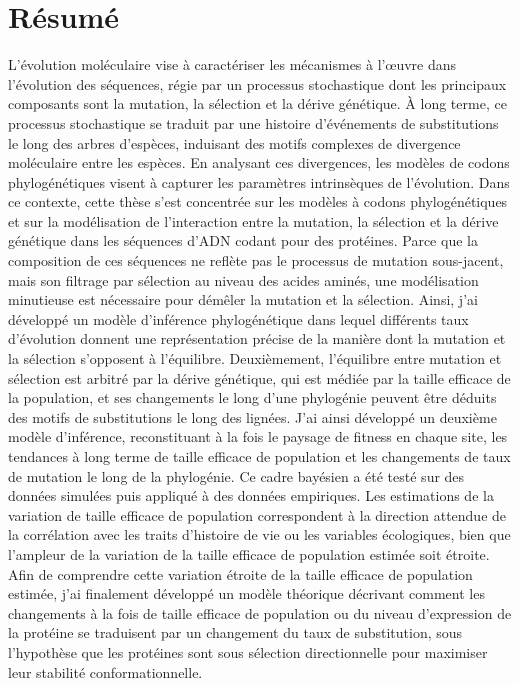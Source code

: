 \thispagestyle{empty}

\section*{Résumé}

L'évolution moléculaire vise à caractériser les mécanismes à l'œuvre dans l'évolution des séquences, régie par un processus stochastique dont les principaux composants sont la mutation, la sélection et la dérive génétique.
À long terme, ce processus stochastique se traduit par une histoire d'événements de substitutions le long des arbres d'espèces, induisant des motifs complexes de divergence moléculaire entre les espèces.
En analysant ces divergences, les modèles de codons phylogénétiques visent à capturer les paramètres intrinsèques de l'évolution.
Dans ce contexte, cette thèse s'est concentrée sur les modèles à codons phylogénétiques et sur la modélisation de l'interaction entre la mutation, la sélection et la dérive génétique dans les séquences d'ADN codant pour des protéines.
Parce que la composition de ces séquences ne reflète pas le processus de mutation sous-jacent, mais son filtrage par sélection au niveau des acides aminés, une modélisation minutieuse est nécessaire pour démêler la mutation et la sélection.
Ainsi, j'ai développé un modèle d'inférence phylogénétique dans lequel différents taux d'évolution donnent une représentation précise de la manière dont la mutation et la sélection s'opposent à l’équilibre.
Deuxièmement, l'équilibre entre mutation et sélection est arbitré par la dérive génétique, qui est médiée par la taille efficace de la population, et ses changements le long d'une phylogénie peuvent être déduits des motifs de substitutions le long des lignées.
J'ai ainsi développé un deuxième modèle d'inférence, reconstituant à la fois le paysage de fitness en chaque site, les tendances à long terme de taille efficace de population et les changements de taux de mutation le long de la phylogénie.
Ce cadre bayésien a été testé sur des données simulées puis appliqué à des données empiriques.
Les estimations de la variation de taille efficace de population correspondent à la direction attendue de la corrélation avec les traits d’histoire de vie ou les variables écologiques, bien que l'ampleur de la variation de la taille efficace de population estimée soit étroite.
Afin de comprendre cette variation étroite de la taille efficace de population estimée, j'ai finalement développé un modèle théorique décrivant comment les changements à la fois de taille efficace de population ou du niveau d'expression de la protéine se traduisent par un changement du taux de substitution, sous l'hypothèse que les protéines sont sous sélection directionnelle pour maximiser leur stabilité conformationnelle.

